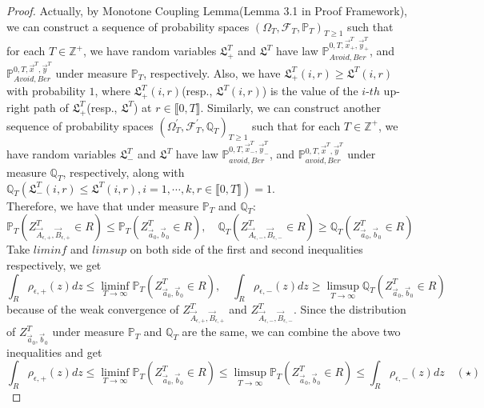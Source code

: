 \begin{proof}
Actually, by Monotone Coupling Lemma(Lemma 3.1 in Proof Framework), we can construct a sequence of probability spaces $(\Omega_{T},\mathcal{F}_{T},\mathbb{P}_{T})_{T\geqslant 1}$ such that for each $T\in\mathbb{Z}^{+}$, we have random variables $\mathfrak{L}_{+}^{T}$ and $\mathfrak{L}^{T}$ have law $\mathbb{P}_{Avoid,Ber}^{0,T,\vec{x}^{T}_{+},\vec{y}^{T}_{+}}$, and $\mathbb{P}_{Avoid,Ber}^{0,T,\vec{x}^{T},\vec{y}^{T}}$ under measure $\mathbb{P}_{T}$, respectively. Also, we have $\mathfrak{L}_{+}^{T}(i,r)\geqslant \mathfrak{L}^{T}(i,r)$ with probability $1$, where $\mathfrak{L}_{+}^{T}(i,r)$(resp., $\mathfrak{L}^{T}(i,r)$) is the value of the $i$-$th$ up-right path of $\mathfrak{L}_{+}^{T}$(resp., $\mathfrak{L}^{T}$) at $r\in\llbracket 0,T\rrbracket$. Similarly, we can construct another sequence of probability spaces $(\Omega_{T}^{\prime},\mathcal{F}_{T}^{\prime},\mathbb{Q}_{T})_{T\geqslant 1}$ such that for each $T\in\mathbb{Z}^{+}$, we have random variables $\mathfrak{L}_{-}^{T}$ and $\mathfrak{L}^{T}$ have law $\mathbb{P}_{avoid,Ber}^{0,T,\vec{x}^{T}_{-},\vec{y}^{T}_{-}}$, and $\mathbb{P}_{avoid,Ber}^{0,T,\vec{x}^{T},\vec{y}^{T}}$ under measure $\mathbb{Q}_{T}$, respectively, along with $\mathbb{Q}_{T}(\mathfrak{L}_{-}^{T}(i,r)\leqslant \mathfrak{L}^{T}(i,r), i=1,\cdots, k, r\in\llbracket 0,T\rrbracket)=1$.\\
Therefore, we have that under measure $\mathbb{P}_{T}$ and $\mathbb{Q}_{T}$:
$$\mathbb{P}_{T}(Z^{T}_{\vec{A}_{\epsilon,+},\vec{B}_{\epsilon,+}}\in R)\leqslant \mathbb{P}_{T}(Z^{T}_{\vec{a}_{0},\vec{b}_{0}}\in R),\quad \mathbb{Q}_{T}(Z^{T}_{\vec{A}_{\epsilon,-},\vec{B}_{\epsilon,-}}\in R)\geqslant \mathbb{Q}_{T}(Z^{T}_{\vec{a}_{0},\vec{b}_{0}}\in R)$$
Take $liminf$ and $limsup$ on both side of the first and second inequalities respectively, we get
$$\int_{R}\rho_{\epsilon,+}(z)dz\leqslant \liminf_{T\rightarrow\infty}\mathbb{P}_{T}(Z^{T}_{\vec{a}_{0},\vec{b}_{0}}\in R),\quad \int_{R}\rho_{\epsilon,-}(z)dz\geqslant \limsup_{T\rightarrow\infty}\mathbb{Q}_{T}(Z^{T}_{\vec{a}_{0},\vec{b}_{0}}\in R)$$
because of the weak convergence of $Z^{T}_{\vec{A}_{\epsilon,+},\vec{B}_{\epsilon,+}}$ and $Z^{T}_{\vec{A}_{\epsilon,-},\vec{B}_{\epsilon,-}}$. Since the distribution of $Z^{T}_{\vec{a}_{0},\vec{b}_{0}}$ under measure $\mathbb{P}_{T}$ and $\mathbb{Q}_{T}$ are the same, we can combine the above two inequalities and get
$$\int_{R}\rho_{\epsilon,+}(z)dz\leqslant \liminf_{T\rightarrow\infty}\mathbb{P}_{T}(Z^{T}_{\vec{a}_{0},\vec{b}_{0}}\in R)\leqslant\limsup_{T\rightarrow\infty}\mathbb{P}_{T}(Z^{T}_{\vec{a}_{0},\vec{b}_{0}}\in R)\leqslant\int_{R}\rho_{\epsilon,-}(z)dz \quad (\star)$$

\end{proof}
